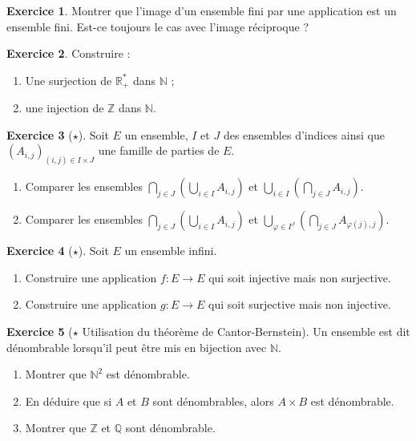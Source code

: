 \documentclass[french]{book}
\newcommand{\N}{\mathbb{N}}
\newcommand{\Z}{\mathbb{Z}}
\newcommand{\Q}{\mathbb{Q}}
\newcommand{\R}{\mathbb{R}}
\newcommand{\st}{^*}
\theoremstyle{definition}
\newtheorem{ex}{Exercice}[chapter]
\theoremstyle{theorem}
\theoremstyle{remark}
\begin{document}
\begin{ex}
	Montrer que l'image d'un ensemble fini par une application est un ensemble fini. Est-ce toujours le cas avec l'image réciproque ?
\end{ex}

\begin{ex}
	Construire : 
	\begin{enumerate}
		\item Une surjection de $\R_+\st$ dans $\N$ ;
		\item une injection de $\Z$ dans $\N$.
	\end{enumerate}
\end{ex}

\begin{ex}[$\star$]
	Soit $E$ un ensemble, $I$ et $J$ des ensembles d'indices ainsi que $(A_{i,j})_{(i,j)\in I\times J}$ une famille de parties de $E$.
	\begin{enumerate}
		\item Comparer les ensembles $\displaystyle\bigcap_{j\in J}\left(\bigcup_{i\in I}A_{i,j}\right)$ et $\displaystyle\bigcup_{i\in I}\left(\bigcap_{j\in J}A_{i,j}\right)$.
		\item Comparer les ensembles $\displaystyle\bigcap_{j\in J}\left(\bigcup_{i\in I}A_{i,j}\right)$ et $\displaystyle\bigcup_{\varphi\in I^J}\left(\bigcap_{j\in J}A_{\varphi(j),j}\right)$.
	\end{enumerate}
\end{ex}

\begin{ex}[$\star$]
	Soit $E$ un ensemble infini.
	\begin{enumerate}
		\item Construire une application $f:E\to E$ qui soit injective mais non surjective.
		\item Construire une application $g:E\to E$ qui soit surjective mais non injective.
	\end{enumerate}
\end{ex}

\begin{ex}[$\star$ Utilisation du théorème de Cantor-Bernstein]
	Un ensemble est dit dénombrable lorsqu'il peut être mis en bijection avec $\N$.
	\begin{enumerate}
		\item Montrer que $\N^2$ est dénombrable.
		\item En déduire que si $A$ et $B$ sont dénombrables, alors $A\times B$ est dénombrable.
		\item Montrer que $\Z$ et $\Q$ sont dénombrable.
	\end{enumerate}
\end{ex}
\end{document}
